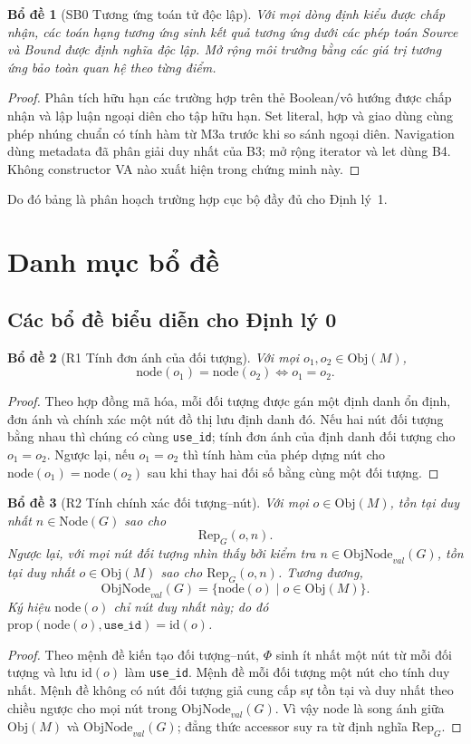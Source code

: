 \documentclass[11pt,a4paper]{article}
\newtheorem{lemma}{Bổ đề}
\theoremstyle{definition}
\newcommand{\Obj}{\mathrm{Obj}}
\newcommand{\Node}{\mathrm{Node}}
\newcommand{\id}{\mathrm{id}}
\newcommand{\node}{\mathrm{node}}
\newcommand{\RepG}{\mathrm{Rep}_{G}}
\newcommand{\prop}{\mathrm{prop}}
\newcommand{\PhiEnc}{\Phi}
\newcommand{\ObjNodeVal}{\mathrm{ObjNode}_{val}}
\begin{document}
\begin{lemma}[SB0 Tương ứng toán tử độc lập]
Với mọi dòng định kiểu được chấp nhận, các toán hạng tương ứng sinh kết quả
tương ứng dưới các phép toán Source và Bound được định nghĩa độc lập. Mở rộng
môi trường bằng các giá trị tương ứng bảo toàn quan hệ theo từng điểm.
\end{lemma}
\begin{proof}
Phân tích hữu hạn các trường hợp trên thẻ Boolean/vô hướng được chấp nhận và
lập luận ngoại diên cho tập hữu hạn. Set literal, hợp và giao dùng cùng phép
nhúng chuẩn có tính hàm từ M3a trước khi so sánh ngoại diên. Navigation
dùng metadata đã phân giải duy nhất của B3; mở rộng iterator và let dùng B4.
Không constructor VA nào xuất hiện trong chứng minh này.
\end{proof}
Do đó bảng là phân hoạch trường hợp cục bộ đầy đủ cho Định lý~1.

\section{Danh mục bổ đề}

\subsection{Các bổ đề biểu diễn cho Định lý 0}

\begin{lemma}[R1 Tính đơn ánh của đối tượng]
Với mọi $o_1,o_2\in \Obj(M)$,
\[
\node(o_1)=\node(o_2) \iff o_1=o_2.
\]
\end{lemma}
\begin{proof}
Theo hợp đồng mã hóa, mỗi đối tượng được gán một định danh ổn định, đơn ánh và
chính xác một nút đồ thị lưu định danh đó. Nếu hai nút đối tượng bằng nhau thì
chúng có cùng \texttt{use\_id}; tính đơn ánh của định danh đối tượng cho
$o_1=o_2$. Ngược lại, nếu $o_1=o_2$ thì tính hàm của phép dựng nút cho
$\node(o_1)=\node(o_2)$ sau khi thay hai đối số bằng cùng một đối tượng.
\end{proof}

\begin{lemma}[R2 Tính chính xác đối tượng--nút]
Với mọi $o\in \Obj(M)$, tồn tại duy nhất $n\in \Node(G)$ sao cho
\[
\RepG(o,n).
\]
Ngược lại, với mọi nút đối tượng nhìn thấy bởi kiểm tra
$n\in\ObjNodeVal(G)$, tồn tại duy nhất $o\in\Obj(M)$ sao cho
$\RepG(o,n)$. Tương đương,
\[
\ObjNodeVal(G)=\{\node(o)\mid o\in\Obj(M)\}.
\]
Ký hiệu $\node(o)$ chỉ nút duy nhất này; do đó
$\prop(\node(o),\texttt{use\_id})=\id(o)$.
\end{lemma}
\begin{proof}
Theo mệnh đề kiến tạo đối tượng--nút, $\PhiEnc$ sinh ít nhất một nút từ mỗi đối
tượng và lưu $\id(o)$ làm \texttt{use\_id}. Mệnh đề mỗi đối tượng một nút cho
tính duy nhất. Mệnh đề không có nút đối tượng giả cung cấp sự tồn tại và duy
nhất theo chiều ngược cho mọi nút trong $\ObjNodeVal(G)$. Vì vậy $\node$ là
song ánh giữa $\Obj(M)$ và $\ObjNodeVal(G)$; đẳng thức accessor suy ra từ định
nghĩa $\RepG$.
\end{proof}
\end{document}
